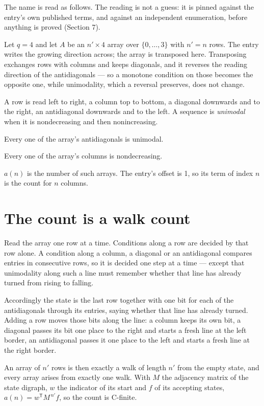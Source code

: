 \documentclass[11pt]{article}
\theoremstyle{definition}
\begin{document}
The name is read as follows. The reading is not a guess: it is pinned against the entry's own published terms, and against an independent enumeration, before anything is proved (Section 7).

Let $q = 4$ and let $A$ be an $n' \times 4$ array over $\{0,\dots,3\}$ with $n' = n$ rows. The entry writes the growing direction across; the array is transposed here. Transposing exchanges rows with columns and keeps diagonals, and it reverses the reading direction of the antidiagonals --- so a monotone condition on those becomes the opposite one, while unimodality, which a reversal preserves, does not change.

A row is read left to right, a column top to bottom, a diagonal downwards and to the right, an antidiagonal downwards and to the left. A sequence is {\itshape unimodal} when it is nondecreasing and then nonincreasing.

Every one of the array's antidiagonals is unimodal.

Every one of the array's columns is nondecreasing.

$a(n)$ is the number of such arrays. The entry's offset is 1, so its term of index $n$ is the count for $n$ columns.

\section{The count is a walk count}

Read the array one row at a time. Conditions along a row are decided by that row alone. A condition along a column, a diagonal or an antidiagonal compares entries in consecutive rows, so it is decided one step at a time --- except that unimodality along such a line must remember whether that line has already turned from rising to falling.

Accordingly the state is the last row together with one bit for each of the antidiagonals through its entries, saying whether that line has already turned. Adding a row moves those bits along the line: a column keeps its own bit, a diagonal passes its bit one place to the right and starts a fresh line at the left border, an antidiagonal passes it one place to the left and starts a fresh line at the right border.

An array of $n'$ rows is then exactly a walk of length $n'$ from the empty state, and every array arises from exactly one walk. With $M$ the adjacency matrix of the state digraph, $w$ the indicator of its start and $f$ of its accepting states, $a(n) = w^{\mathsf T}M^{\,n'}f$, so the count is C-finite.
\end{document}
